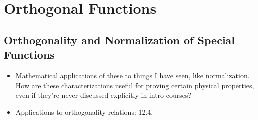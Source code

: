 \documentclass[../finalProject.tex]{subfiles}
\begin{document}
\section{Orthogonal Functions}
\setcounter{subsection}{3}
\subsection{Orthogonality and Normalization of Special Functions}
\begin{itemize}
    \item {}Mathematical applications of these to things I have seen, like normalization. How are these characterizations useful for proving certain physical properties, even if they're never discussed explicitly in intro courses?
    \item Applications to orthogonality relations: 12.4.
\end{itemize}
\end{document}
